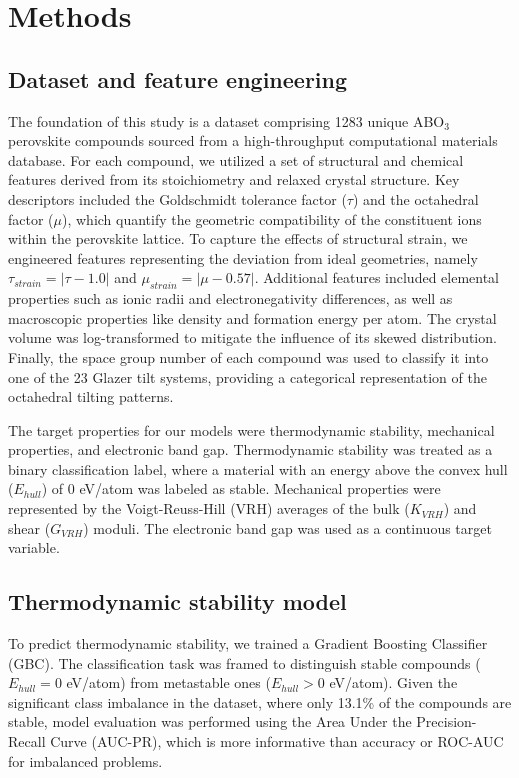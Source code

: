 \documentclass[]{article}
\begin{document}
\section{Methods}
\label{sec:methods}
\subsection{Dataset and feature engineering}
The foundation of this study is a dataset comprising 1283 unique ABO$_3$ perovskite compounds sourced from a high-throughput computational materials database. For each compound, we utilized a set of structural and chemical features derived from its stoichiometry and relaxed crystal structure. Key descriptors included the Goldschmidt tolerance factor ($\tau$) and the octahedral factor ($\mu$), which quantify the geometric compatibility of the constituent ions within the perovskite lattice. To capture the effects of structural strain, we engineered features representing the deviation from ideal geometries, namely $\tau_{strain} = |\tau - 1.0|$ and $\mu_{strain} = |\mu - 0.57|$. Additional features included elemental properties such as ionic radii and electronegativity differences, as well as macroscopic properties like density and formation energy per atom. The crystal volume was log-transformed to mitigate the influence of its skewed distribution. Finally, the space group number of each compound was used to classify it into one of the 23 Glazer tilt systems, providing a categorical representation of the octahedral tilting patterns.

The target properties for our models were thermodynamic stability, mechanical properties, and electronic band gap. Thermodynamic stability was treated as a binary classification label, where a material with an energy above the convex hull ($E_{hull}$) of 0 eV/atom was labeled as stable. Mechanical properties were represented by the Voigt-Reuss-Hill (VRH) averages of the bulk ($K_{VRH}$) and shear ($G_{VRH}$) moduli. The electronic band gap was used as a continuous target variable.

\subsection{Thermodynamic stability model}
To predict thermodynamic stability, we trained a Gradient Boosting Classifier (GBC). The classification task was framed to distinguish stable compounds ($E_{hull} = 0$ eV/atom) from metastable ones ($E_{hull} > 0$ eV/atom). Given the significant class imbalance in the dataset, where only 13.1\% of the compounds are stable, model evaluation was performed using the Area Under the Precision-Recall Curve (AUC-PR), which is more informative than accuracy or ROC-AUC for imbalanced problems.
\end{document}
